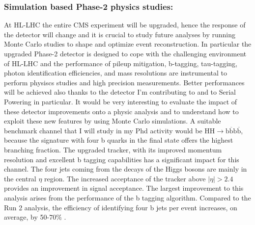 \documentclass[a4paper,11pt,english]{article}
\begin{document}
\subsubsection*{Simulation based Phase-2 physics studies:}
\vspace{-.2cm}
At HL-LHC %
the entire CMS experiment will be upgraded, hence the response of the detector will change and it is crucial to study future analyses by running Monte Carlo studies to shape and optimize event reconstruction. In particular the upgraded Phase-2 detector is designed to cope with the challenging environment of \mbox{HL-LHC} and the performance of pileup mitigation, b-tagging, tau-tagging, photon identification efficiencies, and mass resolutions are instrumental to perform physiscs studies and high precision measurements. 
Better performances will be achieved also thanks to the detector I'm contributing to and to Serial Powering in particular. It would be very interesting to evaluate the impact of these detector improvements onto a physic analysis and to understand how to exploit these new features by using Monte Carlo simulations. %
A suitable benchmark channel that I will study in my Phd activity  would be  $\mathrm{HH \rightarrow b\overline{b}b\overline{b}}$, because the signature with four b quarks in the final state offers the highest branching
fraction. 
The upgraded tracker, with its improved momentum resolution and excellent b tagging capabilities has a significant impact for this channel. The four jets coming from the decays of the Higgs bosons are mainly in the central $\eta$ region. The increased acceptance of the tracker above $\mid \eta \mid > 2.4$ provides an improvement in signal acceptance. 
The largest improvement to this analysis arises from the performance of the b tagging algorithm. Compared to the Run 2 analysis, the efficiency of identifying four b jets per event increases, on average, by 50-70\% \cite{TDR}.
\end{document}

